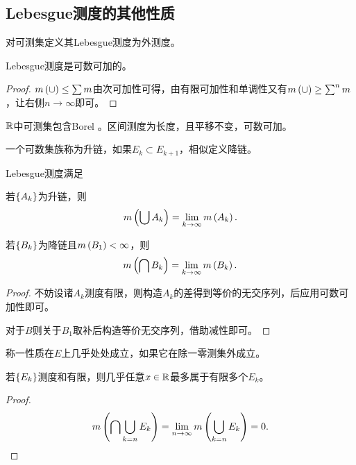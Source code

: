 \documentclass{ctexrep}
\begin{document}
  \subsection{Lebesgue测度的其他性质}
  \begin{definition}
    对可测集定义其Lebesgue测度为外测度。
  \end{definition}
  \begin{theorem}
    Lebesgue测度是可数可加的。
  \end{theorem}
  \begin{proof}
    $m\left(\cup\right)\le\sum m$由次可加性可得，由有限可加性和单调性又有$m\left(\cup\right)\ge\sum^n m$，让右侧$n\to\infty$即可。
  \end{proof}
  \begin{theorem}
    $\mathbb{R}$中可测集包含Borel \siga 。区间测度为长度，且平移不变，可数可加。
  \end{theorem}
  \begin{definition}
    一个可数集族称为升链，如果$E_k\subset E_{k+1}$，相似定义降链。
  \end{definition}
  \begin{theorem}
    Lebesgue测度满足
    \begin{aenum}
      \item 若$\left\{A_k\right\}$为升链，则
      \[ m\left(\bigcup A_k\right) = \lim_{k\to\infty}m\left(A_k\right). \]
      \item 若$\left\{B_k\right\}$为降链且$m\left(B_1\right)<\infty$，则
      \[ m\left(\bigcap B_k\right) = \lim_{k\to\infty}m\left(B_k\right). \]
    \end{aenum}
  \end{theorem}
  \begin{proof}
    不妨设诸$A_k$测度有限，则构造$A_k$的差得到等价的无交序列，后应用可数可加性即可。
    \par
    对于$B$则关于$B_1$取补后构造等价无交序列，借助减性即可。
  \end{proof}
  \begin{definition}
    称一性质在$E$上几乎处处成立，如果它在除一零测集外成立。
  \end{definition}
  \begin{lemma}
    若$\left\{E_k\right\}$测度和有限，则几乎任意$x\in\mathbb{R}$最多属于有限多个$E_k$。
  \end{lemma}
  \begin{proof}
    \[ m\left(\bigcap\bigcup_{k=n}E_k\right)=\lim_{n\to\infty}m\left(\bigcup_{k=n}E_k\right) = 0.\qedhere \]
  \end{proof}
\end{document}
